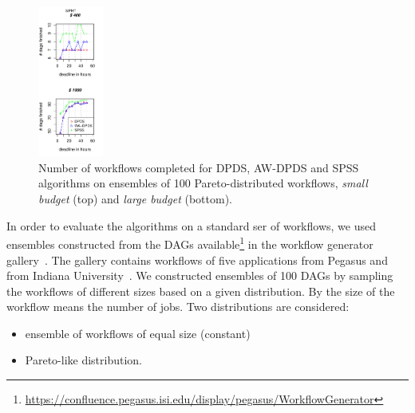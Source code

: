 \documentclass{sig-alternate}
\begin{document}
\begin{figure}[t]
\includegraphics[width=0.19\textwidth]{figures/pareto-SIPHT-n-1000-8-dagh5-50m0.pdf}
\caption{Number of workflows completed for DPDS, AW-DPDS and SPSS
algorithms on ensembles of 100 Pareto-distributed workflows, {\em small budget}
(top) and {\em large budget} (bottom).}
\label{fig:number-complete-pareto}
\end{figure}






In order to evaluate the algorithms on a standard ser of workflows, we used
ensembles constructed from the DAGs available\footnote{\url{https://confluence.pegasus.isi.edu/display/pegasus/WorkflowGenerator}}
in the workflow generator gallery~\cite{Bharathi08}. The gallery contains
workflows of five applications from Pegasus and from Indiana
University~\cite{Ramakrishnan08}. We constructed ensembles of 100 DAGs by sampling the
workflows of different sizes based on a given distribution. By the size of the
workflow means the number of jobs. Two distributions are considered:
\begin{itemize}
  \item ensemble of workflows of equal size (constant)
  \item Pareto-like distribution.
\end{itemize}
\end{document}
